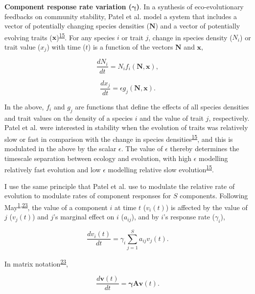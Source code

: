 \documentclass[]{article}
\begin{document}
\textbf{Component response rate variation (\(\mathbf{\gamma}\))}. In a
synthesis of eco-evolutionary feedbacks on community stability, Patel et
al. model a system that includes a vector of potentially changing
species densities (\(\mathbf{N}\)) and a vector of potentially evolving
traits
(\(\mathbf{x}\))\textsuperscript{\protect\hyperlink{ref-Patel2018}{15}}.
For any species \(i\) or trait \(j\), change in species density
(\(N_{i}\)) or trait value (\(x_{j}\)) with time (\(t\)) is a function
of the vectors \(\mathbf{N}\) and \(\mathbf{x}\),

\[\frac{dN_{i}}{dt} = N_{i}f_{i}(\mathbf{N}, \mathbf{x}),\]

\[\frac{dx_{j}}{dt} = \epsilon g_{j}(\mathbf{N}, \mathbf{x}).\]

In the above, \(f_{i}\) and \(g_{j}\) are functions that define the
effects of all species densities and trait values on the density of a
species \(i\) and the value of trait \(j\), respectively. Patel et al.
were interested in stability when the evolution of traits was relatively
slow or fast in comparison with the change in species
densities\textsuperscript{\protect\hyperlink{ref-Patel2018}{15}}, and
this is modulated in the above by the scalar \(\epsilon\). The value of
\(\epsilon\) thereby determines the timescale separation between ecology
and evolution, with high \(\epsilon\) modelling relatively fast
evolution and low \(\epsilon\) modelling relative slow
evolution\textsuperscript{\protect\hyperlink{ref-Patel2018}{15}}.

I use the same principle that Patel et al. use to modulate the relative
rate of evolution to modulate rates of component responses for \(S\)
components. Following
May\textsuperscript{\protect\hyperlink{ref-May1972}{1},\protect\hyperlink{ref-May1973}{23}},
the value of a component \(i\) at time \(t\) (\(v_{i}(t)\)) is affected
by the value of \(j\) (\(v_{j}(t)\)) and \(j\)'s marginal effect on
\(i\) (\(a_{ij}\)), and by \(i\)'s response rate (\(\gamma_{i}\)),

\[\frac{dv_{i}(t)}{dt} = \gamma_{i} \sum_{j=1}^{S}a_{ij}v_{j}(t).\]

In matrix notation\textsuperscript{\protect\hyperlink{ref-May1973}{23}},

\[\frac{d\mathbf{v}(t)}{dt} = \mathbf{\gamma} \mathbf{A}\mathbf{v}(t).\]
\end{document}
